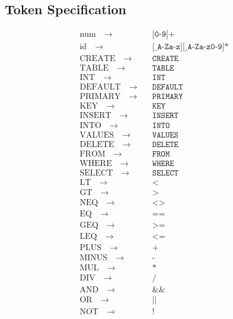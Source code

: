 \documentclass{article}
\begin{document}
\subsection {Token Specification}
\begin{align*}
\text{num}\quad\to\quad & \texttt{[0-9]+} \\
\text{id}\quad\to\quad & \texttt{[\_A-Za-z][\_A-Za-z0-9]*} \\
\text{CREATE}\quad\to\quad & \texttt{CREATE} \\
\text{TABLE}\quad\to\quad & \texttt{TABLE} \\
\text{INT}\quad\to\quad & \texttt{INT} \\
\text{DEFAULT}\quad\to\quad & \texttt{DEFAULT} \\
\text{PRIMARY}\quad\to\quad & \texttt{PRIMARY} \\
\text{KEY}\quad\to\quad & \texttt{KEY} \\
\text{INSERT}\quad\to\quad & \texttt{INSERT} \\
\text{INTO}\quad\to\quad & \texttt{INTO} \\
\text{VALUES}\quad\to\quad & \texttt{VALUES} \\
\text{DELETE}\quad\to\quad & \texttt{DELETE} \\
\text{FROM}\quad\to\quad & \texttt{FROM} \\
\text{WHERE}\quad\to\quad & \texttt{WHERE} \\
\text{SELECT}\quad\to\quad & \texttt{SELECT} \\
\text{LT}\quad\to\quad & \texttt{<} \\
\text{GT}\quad\to\quad & \texttt{>} \\
\text{NEQ}\quad\to\quad & \texttt{<>} \\
\text{EQ}\quad\to\quad & \texttt{==} \\
\text{GEQ}\quad\to\quad & \texttt{>=} \\
\text{LEQ}\quad\to\quad & \texttt{<=} \\
\text{PLUS}\quad\to\quad & \texttt{+} \\
\text{MINUS}\quad\to\quad & \texttt{-} \\
\text{MUL}\quad\to\quad & \texttt{*} \\
\text{DIV}\quad\to\quad & \texttt{/} \\
\text{AND}\quad\to\quad & \texttt{\&\&} \\
\text{OR}\quad\to\quad & \texttt{||} \\
\text{NOT}\quad\to\quad & \texttt{!} \\

\end{align*}
\end{document}
